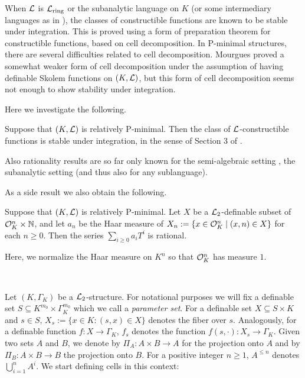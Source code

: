When ${\mathcal L}$ is ${\mathcal L}_{\rm ring}$ or the subanalytic language on $K$ (or some intermediary languages as in \cite{CLip}), the classes of constructible functions are known to be stable under integration. This is proved using a form of preparation theorem for constructible functions, based on cell decomposition. In P-minimal structures, there are several difficulties related to cell decomposition. Mourgues \cite{mou-09} proved a somewhat weaker form of cell decomposition under the assumption of having definable Skolem functions on $(K,{\mathcal L})$, but this form of cell decomposition seems not enough to show stability under integration.

Here we investigate the following.

\begin{thm}\label{thm1}
Suppose that $(K,{\mathcal L})$ is relatively P-minimal. Then the class of ${\mathcal L}$-constructible functions is stable under integration, in the sense of Section 3 of \cite{Clu-Gor-Hal-14}.
\end{thm}

Also rationality results are so far only known for the semi-algebraic setting \cite{denef-84}, the subanalytic setting \cite{denef-vdd-88} (and thus also for any sublanguage).

As a side result we also obtain the following.

\begin{thm}\label{thm:rationality}
Suppose that $(K,{\mathcal L})$ is relatively P-minimal. Let $X$ be a ${\mathcal L}_2$-definable subset of ${\mathcal O}_K^n\times {\mathbb N}$, and let $a_n$ be the Haar measure of $X_n:=\{x\in {\mathcal O}_K^n\mid (x,n)\in X\}$ for each $n\geq 0$. Then the series $\sum_{i\geq 0} a_i T^i$ is rational. 
\end{thm}
Here, we normalize the Haar measure on $K^n$ so that ${\mathcal O}_K^n$ has measure $1$. 

\

Let $(K,\Gamma_K)$ be a ${\mathcal L}_2$-structure. For notational purposes we will fix a definable set $S \subseteq K^{m_0} \times \Gamma_K^{m_0}$ which we call a \emph{parameter set}. For a definable set $X\subseteq S\times K$ and $s\in S$, $X_s:=\{x\in K: (s,x)\in X\}$ denotes the fiber over $s$. Analogously, for a definable function $f:X\rightarrow \Gamma_K$, $f_s$ denotes the function $f(s,\cdot):X_s\rightarrow \Gamma_K$. Given two sets $A$ and $B$, we denote by $\Pi_{A}:A\times B\to A$ for the projection onto $A$ and by $\Pi_B:A\times B\to B$ the projection onto $B$. For a positive integer $n\geq 1$, $A^{\leq n}$ denotes $\bigcup_{i=1}^n A^i$. We start defining cells in this context: 


